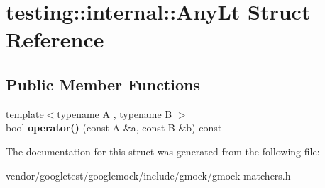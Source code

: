 \hypertarget{structtesting_1_1internal_1_1AnyLt}{}\section{testing\+:\+:internal\+:\+:Any\+Lt Struct Reference}
\label{structtesting_1_1internal_1_1AnyLt}
\subsection*{Public Member Functions}
\begin{DoxyCompactItemize}
\item 
{\footnotesize template$<$typename A , typename B $>$ }\\bool {\bfseries operator()} (const A \&a, const B \&b) const \hypertarget{structtesting_1_1internal_1_1AnyLt_acaffdd6801085f79487cd3704444077e}{}\label{structtesting_1_1internal_1_1AnyLt_acaffdd6801085f79487cd3704444077e}

\end{DoxyCompactItemize}


The documentation for this struct was generated from the following file\+:\begin{DoxyCompactItemize}
\item 
vendor/googletest/googlemock/include/gmock/gmock-\/matchers.\+h\end{DoxyCompactItemize}
